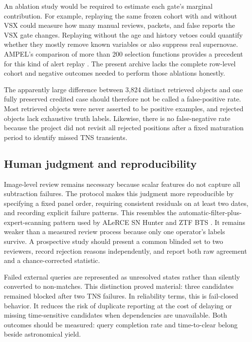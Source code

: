 \documentclass[11pt]{article}
\begin{document}
An ablation study would be required to estimate each gate's marginal contribution. For example, replaying the same frozen cohort with and without VSX could measure how many manual reviews, packets, and false reports the VSX gate changes. Replaying without the age and history vetoes could quantify whether they mostly remove known variables or also suppress real supernovae. AMPEL's comparison of more than 200 selection functions provides a precedent for this kind of alert replay \citep{nordin2019}. The present archive lacks the complete row-level cohort and negative outcomes needed to perform those ablations honestly.

The apparently large difference between 3,824 distinct retrieved objects and one fully preserved credited case should therefore not be called a false-positive rate. Most retrieved objects were never asserted to be positive examples, and rejected objects lack exhaustive truth labels. Likewise, there is no false-negative rate because the project did not revisit all rejected positions after a fixed maturation period to identify missed TNS transients.

\subsection{Human judgment and reproducibility}

Image-level review remains necessary because scalar features do not capture all subtraction failures. The protocol makes this judgment more reproducible by specifying a fixed panel order, requiring consistent residuals on at least two dates, and recording explicit failure patterns. This resembles the automatic-filter-plus-expert-scanning pattern used by ALeRCE SN Hunter and ZTF BTS \citep{carrascodavis2021,fremling2020}. It remains weaker than a measured review process because only one operator's labels survive. A prospective study should present a common blinded set to two reviewers, record rejection reasons independently, and report both raw agreement and a chance-corrected statistic.

Failed external queries are represented as unresolved states rather than silently converted to non-matches. This distinction proved material: three candidates remained blocked after two TNS failures. In reliability terms, this is fail-closed behavior. It reduces the risk of duplicate reporting at the cost of delaying or missing time-sensitive candidates when dependencies are unavailable. Both outcomes should be measured: query completion rate and time-to-clear belong beside astronomical yield.
\end{document}
